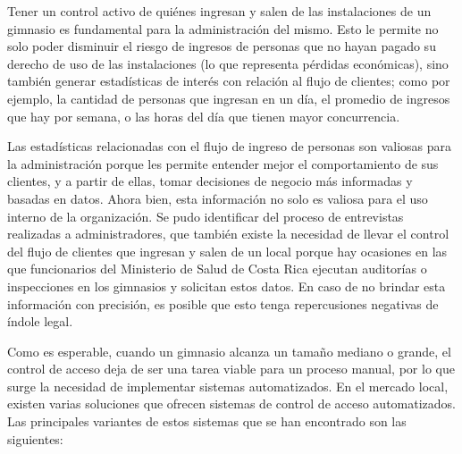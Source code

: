  Tener un control activo de quiénes ingresan y salen de las instalaciones de un gimnasio es fundamental para la administración del mismo. Esto le permite no solo poder disminuir el riesgo de ingresos de personas que no hayan pagado su derecho de uso de las instalaciones (lo que representa pérdidas económicas), sino también generar estadísticas de interés con relación al flujo de clientes; como por ejemplo, la cantidad de personas que ingresan en un día, el promedio de ingresos que hay por semana, o las horas del día que tienen mayor concurrencia.

 Las estadísticas relacionadas con el flujo de ingreso de personas son valiosas para la administración porque les permite entender mejor el comportamiento de sus clientes, y a partir de ellas, tomar decisiones de negocio más informadas y basadas en datos. Ahora bien, esta información no solo es valiosa para el uso interno de la organización. Se pudo identificar del proceso de entrevistas realizadas a administradores, que también existe la necesidad de llevar el control del flujo de clientes que ingresan y salen de un local porque hay ocasiones en las que funcionarios del Ministerio de Salud de Costa Rica ejecutan auditorías o inspecciones en los gimnasios y solicitan estos datos. En caso de no brindar esta información con precisión, es posible que esto tenga repercusiones negativas de índole legal.
 
 Como es esperable, cuando un gimnasio alcanza un tamaño mediano o grande, el control de acceso deja de ser una tarea viable para un proceso manual, por lo que surge la necesidad de implementar sistemas automatizados. En el mercado local, existen varias soluciones que ofrecen sistemas de control de acceso automatizados. Las principales variantes de estos sistemas que se han encontrado son las siguientes:
 
